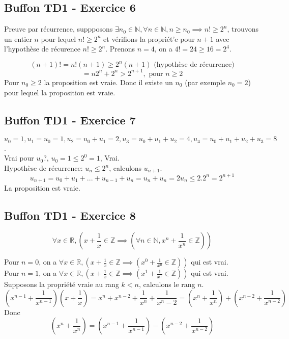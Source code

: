 \documentclass[]{book}
\theoremstyle{definition}
\newcommand{\bb}[1]{\mathbb{#1}}
\newcommand{\Z}{\bb{Z}}
\newcommand{\R}{\bb{R}}
\newcommand{\N}{\bb{N}}
\begin{document}
\subsection*{Buffon TD1 - Exercice 6}
Preuve par r\'ecurrence, suppposons $\exists n_0 \in \N, \forall n \in \N, n \geq n_0 \implies n! \geq 2^{n}$, trouvons un entier $n$ pour lequel $n! \geq 2^n$ et v\'erifions la propri\'et'e pour $n+1$ avec l'hypoth\`ese de r\'ecurence $n! \geq 2^{n}$.
Prenons $n=4$, on a $4! = 24 \geq 16 = 2^4$. 

$$(n+1)! = n!(n+1) \geq 2^n(n+1) \text{ (hypoth\`ese de r\'ecurrence)}$$
$$ = n2^n + 2^n > 2^{n+1}, \text{ pour } n \geq 2$$
Pour $n_0 \geq 2$ la proposition est vraie. Donc il existe un $n_0$ (par exemple $n_0 =2$) pour lequel la proposition est vraie.

\subsection*{Buffon TD1 - Exercice 7}
$u_0 = 1, u_1 = u_0 = 1, u_2 = u_0+u_1 = 2, u_3 = u_0+u_1+u_2 = 4, u_4 = u_0+u_1+u_2+u_3 = 8$.\\

Vrai pour $u_0$?, $u_0 = 1 \leq 2^0=1$, Vrai.\\
Hypoth\`ese de r\'ecurrence: $u_n \leq 2^n$, calculons $u_{n+1}$.
$$u_{n+1} = u_0 + u_1 + ... + u_{n-1} + u_n = u_n + u_n = 2u_n \leq 2.2^n = 2^{n+1}$$
La proposition est vraie. 

\subsection*{Buffon TD1 - Exercice 8}
$$\forall x \in \R, \left(x+\frac{1}{x} \in \Z \implies \left( \forall n \in \N, x^n + \frac{1}{x^n} \in \Z \right) \right)$$

Pour $n=0$, on a $\forall x \in \R, \left(x+\frac{1}{x} \in \Z \implies \left( x^0 + \frac{1}{x^0} \in \Z \right) \right)$ qui est vrai.\\
Pour $n=1$, on a $\forall x \in \R, \left(x+\frac{1}{x} \in \Z \implies \left( x^1 + \frac{1}{x^1} \in \Z \right) \right)$ qui est vrai.\\

Supposons la propri\'et\'e vraie au rang $k<n$, calculons le rang $n$.
$$\left( x^{n-1} + \frac{1}{x^{n-1}} \right) \left( x + \frac{1}{x} \right) = x^n + x^{n-2} + \frac{1}{x^n} + \frac{1}{x^n-2} = \left( x^{n} + \frac{1}{x^{n}} \right) + \left( x^{n-2} + \frac{1}{x^{n-2}} \right)$$
Donc
$$ \left( x^{n} + \frac{1}{x^{n}} \right) = \left( x^{n-1} + \frac{1}{x^{n-1}} \right) - \left( x^{n-2} + \frac{1}{x^{n-2}} \right)$$
\end{document}

